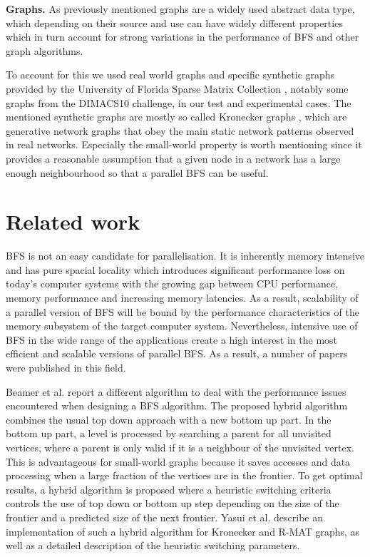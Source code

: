 \documentclass[letterpaper]{article}
\newcommand{\mypar}[1]{{\bf #1.}} %
\begin{document}
	
	\mypar{Graphs}
	As previously mentioned graphs are a widely used abstract data type, which depending on their source and use can have widely different properties which in turn account for strong variations in the performance of BFS and other graph algorithms.
	
	To account for this we used real world graphs and specific synthetic graphs provided by the University of Florida Sparse Matrix Collection \cite{SparseMatrixCollection}, notably some graphs from the DIMACS10 challenge, in our test and experimental cases.
	The mentioned synthetic graphs are mostly so called Kronecker graphs \cite{Leskovec:2010:KGA:1756006.1756039}, which are generative network graphs that obey the main static network patterns observed in real networks.
	Especially the small-world property is worth mentioning since it provides a reasonable assumption that a given node in a network has a large enough neighbourhood so that a parallel BFS can be useful.	
	


	\section{Related work} \label{sec:rewo} %
		BFS is not an easy candidate for parallelisation.
		It is inherently memory intensive and has pure spacial locality which introduces significant performance loss on today's computer systems with the growing gap between CPU performance, memory performance and increasing memory latencies.
		As a result, scalability of a parallel version of BFS will be bound by the performance characteristics of the memory subsystem of the target computer system. 
		Nevertheless, intensive use of BFS in the wide range of the applications create a high interest in the most efficient and scalable versions of parallel BFS.
		As a result, a number of papers were published in this field. 
		
		Beamer et al.\cite{beamer2011searching} report a different algorithm to deal with the performance issues encountered when designing a BFS algorithm. 
		The proposed hybrid algorithm combines the usual top down approach with a new bottom up part. 
		In the bottom up part, a level is processed by searching a parent for all unvisited vertices, where a parent is only valid if it is a neighbour of the unvisited vertex. 
		This is advantageous for small-world graphs because it saves accesses and data processing when a large fraction of the vertices are in the frontier. 
		To get optimal results, a hybrid algorithm is proposed where a heuristic switching criteria controls the use of top down or bottom up step depending on the size of the frontier and a predicted size of the next frontier. 
		Yasui et al.\cite{6691600} describe an implementation of such a hybrid algorithm for Kronecker and R-MAT graphs, as well as a detailed description of the heuristic switching parameters.
	
\end{document}
